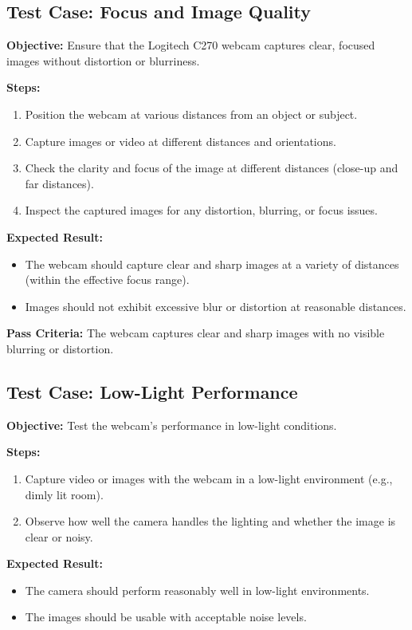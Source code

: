 \subsection{Test Case: Focus and Image Quality}
\textbf{Objective:} Ensure that the Logitech C270 webcam captures clear, focused images without distortion or blurriness.

\textbf{Steps:}
\begin{enumerate}
	\item Position the webcam at various distances from an object or subject.
	\item Capture images or video at different distances and orientations.
	\item Check the clarity and focus of the image at different distances (close-up and far distances).
	\item Inspect the captured images for any distortion, blurring, or focus issues. \cite{Lukse:2020}
\end{enumerate}

\textbf{Expected Result:}
\begin{itemize}
	\item The webcam should capture clear and sharp images at a variety of distances (within the effective focus range).
	\item Images should not exhibit excessive blur or distortion at reasonable distances.
\end{itemize}

\textbf{Pass Criteria:} 
The webcam captures clear and sharp images with no visible blurring or distortion.

\subsection{Test Case: Low-Light Performance}
\textbf{Objective:} Test the webcam’s performance in low-light conditions.

\textbf{Steps:}
\begin{enumerate}
	\item Capture video or images with the webcam in a low-light environment (e.g., dimly lit room).
	\item Observe how well the camera handles the lighting and whether the image is clear or noisy.
\end{enumerate}

\textbf{Expected Result:}
\begin{itemize}
	\item The camera should perform reasonably well in low-light environments.
	\item The images should be usable with acceptable noise levels.
\end{itemize}

